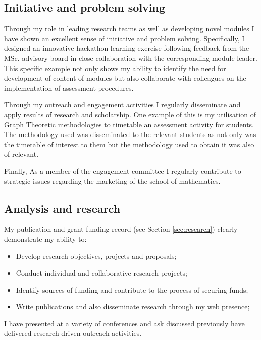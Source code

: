 \documentclass{article}
\begin{document}
\subsection{Initiative and problem solving}

Through my role in leading research teams as well as developing novel modules I have shown an excellent sense of initiative and problem solving.
Specifically, I designed an innovative hackathon learning exercise following feedback from the MSc. advisory board in close collaboration with the corresponding module leader.
This specific example not only shows my ability to identify the need for development of content of modules but also collaborate with colleagues on the implementation of assessment procedures.

Through my outreach and engagement activities I regularly disseminate and apply results of research and scholarship.
One example of this is my utilisation of Graph Theoretic methodologies to timetable an assessment activity for students.
The methodology used was disseminated to the relevant students as not only was the timetable of interest to them but the methodology used to obtain it was also of relevant.

Finally, As a member of the engagement committee I regularly contribute to strategic issues regarding the marketing of the school of mathematics.

\subsection{Analysis and research}

My publication and grant funding record (see Section \ref{sec:research}) clearly demonstrate my ability to:

\begin{itemize}
    \item Develop research objectives, projects and proposals;
    \item Conduct individual and collaborative research projects;
    \item Identify sources of funding and contribute to the process of securing funds;
    \item Write publications and also disseminate research through my web presence;
\end{itemize}

I have presented at a variety of conferences and ask discussed previously have delivered research driven outreach activities.
\end{document}
